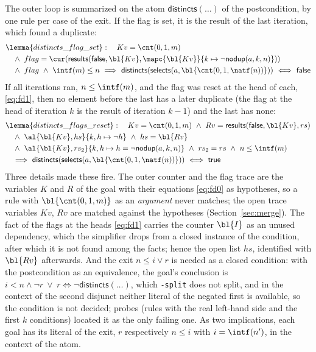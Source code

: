 The outer loop is summarized on the atom $\mathsf{distincts}(\ldots)$ of the postcondition, by one rule per
case of the exit. If the flag is set, it is the result of the last iteration, which found a duplicate:
\begin{align*}
  &\lemma{distincts\_flag\_set}:\quad Kv = \cnt(0, 1, m)\\
  &\quad\wedge\ flag = \cur(\mathsf{results}(\mathsf{false}, \bl{Kv}, \mapc{\bl{Kv}}{k \mapsto \neg\mathsf{nodup}(a, k, n)}))\\
  &\quad\wedge\ flag\ \wedge\ \intf(m) \le n\ \Longrightarrow\ \mathsf{distincts}(\mathsf{selects}(a, \bl{\cnt(0, 1, \natf(n))}))\ \Longleftrightarrow\ \mathsf{false}
\end{align*}
If all iterations ran, $n \le \intf(m)$, and the flag was reset at the head of each, \eqref{eq:fd1}, then no
element before the last has a later duplicate (the flag at the head of iteration $k$ is the result of
iteration $k - 1$) and the last has none:
\begin{align*}
  &\lemma{distincts\_flags\_reset}:\quad Kv = \cnt(0, 1, m)\ \wedge\ Rv = \mathsf{results}(\mathsf{false}, \bl{Kv}, rs)\\
  &\quad\wedge\ \al{\bl{Kv}, hs}{k, h \mapsto \neg h}\ \wedge\ hs = \bl{Rv}\\
  &\quad\wedge\ \al{\bl{Kv}, rs_2}{k, h \mapsto h = \neg\mathsf{nodup}(a, k, n)}\ \wedge\ rs_2 = rs\ \wedge\ n \le \intf(m)\\
  &\quad\Longrightarrow\ \mathsf{distincts}(\mathsf{selects}(a, \bl{\cnt(0, 1, \natf(n))}))\ \Longleftrightarrow\ \mathsf{true}
\end{align*}
Three details made these fire. The outer counter and the flag trace are the variables $K$ and $R$ of the
goal with their equations \eqref{eq:fd0} as hypotheses, so a rule with $\bl{\cnt(0, 1, m)}$ as an
\emph{argument} never matches; the open trace variables $Kv$, $Rv$ are matched against the hypotheses
(Section~\ref{sec:merge}). The fact of the flags at the heads \eqref{eq:fd1} carries the counter $\bl{I}$ as
an unused dependency, which the simplifier drops from a closed instance of the condition, after which it
is not found among the facts; hence the open list $hs$, identified with $\bl{Rv}$ afterwards. And the exit
$n \le i \vee r$ is needed as a closed condition: with the postcondition as an equivalence, the goal's
conclusion is $i < n \wedge \neg r\ \vee\ r \Leftrightarrow \neg\mathsf{distincts}(\ldots)$, which
\texttt{-split} does not split, and in the context of the second disjunct neither literal of the negated
first is available, so the condition is not decided; probes (rules with the real left-hand side and the
first $k$ conditions) located it as the only failing one. As two implications, each goal has its literal
of the exit, $r$ respectively $n \le i$ with $i = \intf(n')$, in the context of the atom.

